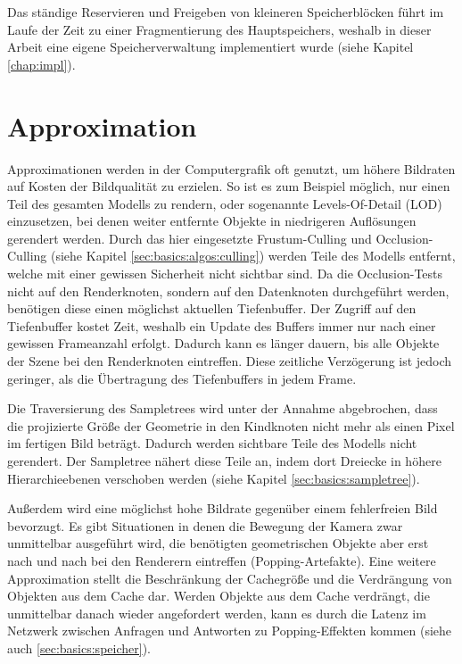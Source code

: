 Das ständige Reservieren und Freigeben von kleineren Speicherblöcken führt im Laufe der Zeit zu einer Fragmentierung des Hauptspeichers, weshalb in dieser Arbeit eine eigene Speicherverwaltung implementiert wurde (siehe Kapitel \ref{chap:impl}). 

\section{Approximation}
\label{sec:basics:approximation}
Approximationen werden in der Computergrafik oft genutzt, um höhere Bildraten auf Kosten der Bildqualität zu erzielen. So ist es zum Beispiel möglich, nur einen Teil des gesamten Modells zu rendern, oder sogenannte Levels-Of-Detail (LOD) einzusetzen, bei denen weiter entfernte Objekte in niedrigeren Auflösungen gerendert werden. Durch das hier eingesetzte Frustum-Culling und Occlusion-Culling (siehe Kapitel \ref{sec:basics:algos:culling}) werden Teile des Modells entfernt, welche mit einer gewissen Sicherheit nicht sichtbar sind. 
Da die Occlusion-Tests nicht auf den Renderknoten, sondern auf den Datenknoten durchgeführt werden, benötigen diese einen möglichst aktuellen Tiefenbuffer. Der Zugriff auf den Tiefenbuffer kostet Zeit, weshalb ein Update des Buffers immer nur nach einer gewissen Frameanzahl erfolgt. Dadurch kann es länger dauern, bis alle Objekte der Szene bei den Renderknoten eintreffen. Diese zeitliche Verzögerung ist jedoch geringer, als die Übertragung des Tiefenbuffers in jedem Frame.


Die Traversierung des Sampletrees wird unter der Annahme abgebrochen, dass die projizierte Größe der Geometrie in den Kindknoten nicht mehr als einen Pixel im fertigen Bild beträgt. Dadurch werden sichtbare Teile des Modells nicht gerendert. Der Sampletree nähert diese Teile an, indem dort Dreiecke in höhere Hierarchieebenen verschoben werden (siehe Kapitel \ref{sec:basics:sampletree}).


Außerdem wird eine möglichst hohe Bildrate gegenüber einem fehlerfreien Bild bevorzugt. Es gibt Situationen in denen die Bewegung der Kamera zwar unmittelbar ausgeführt wird, die benötigten geometrischen Objekte aber erst nach und nach bei den Renderern eintreffen (Popping-Artefakte). Eine weitere Approximation stellt die Beschränkung der Cachegröße und die Verdrängung von Objekten aus dem Cache dar. Werden Objekte aus dem Cache verdrängt, die unmittelbar danach wieder angefordert werden, kann es durch die Latenz im Netzwerk zwischen Anfragen und Antworten zu Popping-Effekten kommen (siehe auch \ref{sec:basics:speicher}). 
